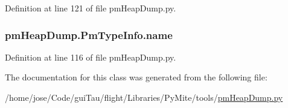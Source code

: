 Definition at line 121 of file pm\-Heap\-Dump.\-py.

\hypertarget{classpm_heap_dump_1_1_pm_type_info_a9684a2b50d6c7dce84b6c9fb27a265b6}{
\subsubsection[{name}]{\setlength{\rightskip}{0pt plus 5cm}pm\-Heap\-Dump.\-Pm\-Type\-Info.\-name}}\label{classpm_heap_dump_1_1_pm_type_info_a9684a2b50d6c7dce84b6c9fb27a265b6}


Definition at line 116 of file pm\-Heap\-Dump.\-py.



The documentation for this class was generated from the following file\-:\begin{DoxyCompactItemize}
\item 
/home/jose/\-Code/gui\-Tau/flight/\-Libraries/\-Py\-Mite/tools/\hyperlink{pm_heap_dump_8py}{pm\-Heap\-Dump.\-py}\end{DoxyCompactItemize}
